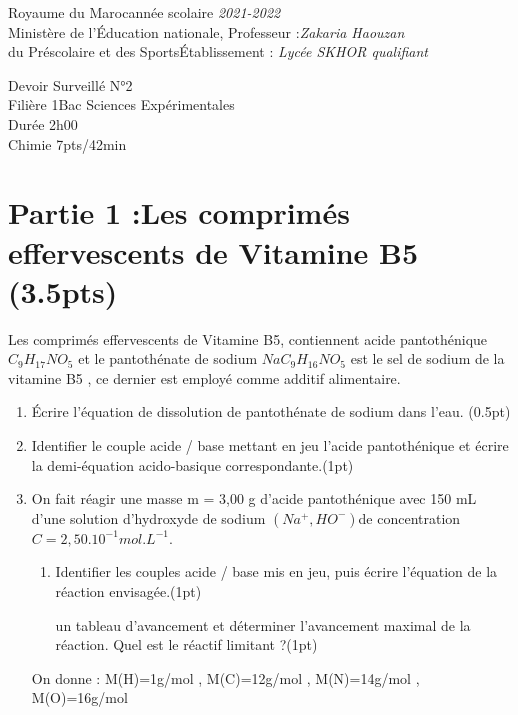 \documentclass[12pt]{article}
\newcommand\headerMe[2]{\noindent{}#1\hfill#2}
\begin{document}
\headerMe{Royaume du Maroc}{année scolaire \emph{2021-2022}}\\
\headerMe{Ministère de l'Éducation nationale, }{  Professeur :\emph{Zakaria Haouzan}}\\
\headerMe{du Préscolaire et des Sports}{Établissement : \emph{Lycée SKHOR qualifiant}}\\

\begin{center}
Devoir Surveillé  N°2 \\
    Filière 1Bac Sciences Expérimentales\\
Durée 2h00
\\
    \vspace{.2cm}
\hrulefill
\Large{Chimie 7pts/42min}
\hrulefill\\

\end{center}

 \section*{Partie 1 :Les comprimés effervescents de Vitamine B5 \dotfill(3.5pts) }
 
 Les comprimés effervescents de Vitamine B5, contiennent acide pantothénique $C_9H_{17}NO_5$ et le
   pantothénate de sodium $NaC_9H_{16}NO_5$ est le sel de sodium de la vitamine B5 , ce dernier est
employé comme additif alimentaire.

\begin{enumerate}

  \item Écrire l’équation de dissolution de pantothénate de sodium dans l’eau. \dotfill(0.5pt)

  \item Identifier le couple acide / base mettant en jeu l’acide pantothénique et écrire la demi-équation acido-basique correspondante.\dotfill(1pt)

\item  On fait réagir une masse m = 3,00 g d’acide pantothénique avec 150 mL d’une solution
d’hydroxyde de sodium $(Na^+, HO^-)$de concentration $C=2,50.10^{-1} mol.L^{-1}$.
    \begin{enumerate}
      \item Identifier les couples acide / base mis en jeu, puis écrire l’équation de la réaction envisagée.\dotfill(1pt)

       un tableau d’avancement et déterminer l’avancement maximal de la réaction. Quel est
        le réactif limitant ?\dotfill(1pt)
    \end{enumerate}
    On donne : M(H)=1g/mol , M(C)=12g/mol , M(N)=14g/mol , M(O)=16g/mol
\end{enumerate}
\end{document}

